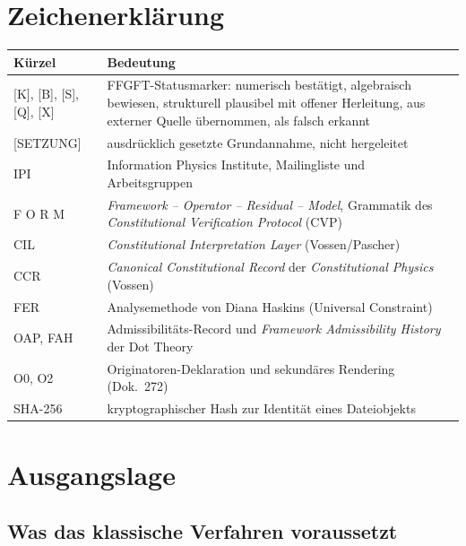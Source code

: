 \section*{Zeichenerklärung}

\medskip
\begin{tabular}{@{}lp{11cm}@{}}
\toprule
\textbf{Kürzel} & \textbf{Bedeutung} \\
\midrule
{[K]}, {[B]}, {[S]}, {[Q]}, {[X]} & FFGFT-Statusmarker: numerisch bestätigt, algebraisch bewiesen,
  strukturell plausibel mit offener Herleitung, aus externer Quelle übernommen, als falsch erkannt \\
{[SETZUNG]} & ausdrücklich gesetzte Grundannahme, nicht hergeleitet \\
IPI & Information Physics Institute, Mailingliste und Arbeitsgruppen \\
F O R M & \emph{Framework -- Operator -- Residual -- Model}, Grammatik des
  \emph{Constitutional Verification Protocol} (CVP) \\
CIL & \emph{Constitutional Interpretation Layer} (Vossen/Pascher) \\
CCR & \emph{Canonical Constitutional Record} der \emph{Constitutional Physics} (Vossen) \\
FER & Analysemethode von Diana Haskins (Universal Constraint) \\
OAP, FAH & Admissibilitäts-Record und \emph{Framework Admissibility History} der Dot Theory \\
O0, O2 & Originatoren-Deklaration und sekundäres Rendering (Dok.~272) \\
SHA-256 & kryptographischer Hash zur Identität eines Dateiobjekts \\
\bottomrule
\end{tabular}

\section{Ausgangslage}

\subsection{Was das klassische Verfahren voraussetzt}

